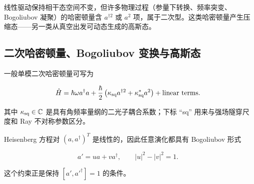 线性驱动保持相干态空间不变，但许多物理过程（参量下转换、频率突变、Bogoliubov 凝聚）的哈密顿量含 $a^{\dagger2}$ 或 $a^2$ 项，属于二次型。这类哈密顿量产生压缩态——另一类从真空出发可动态生成的高斯态。

\subsection{二次哈密顿量、Bogoliubov 变换与高斯态}
一般单模二次哈密顿量可写为

\[
\hat H
=\hbar\omega a^\dagger a
+\frac{\hbar}{2}
\left(\kappa_{\rm sq} a^{\dagger2}+\kappa_{\rm sq}^*a^2\right)
+\text{linear terms}.
\]

其中 \(\kappa_{\rm sq}\in\mathbb C\) 是具有角频率量纲的二光子耦合系数；下标 ``sq'' 用来与强场隧穿尺度和 Ray 不对称参数区分。

Heisenberg 方程对 \((a,a^\dagger)^T\) 是线性的，因此任意演化都具有 Bogoliubov 形式

\[
a' = ua+va^\dagger,
\qquad
|u|^2-|v|^2=1.
\]

这个约束正是保持 \([a',a'^\dagger]=1\) 的条件。


